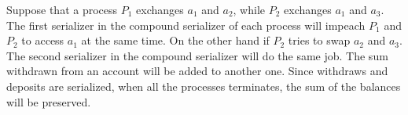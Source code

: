 \documentclass[a4paper,12pt]{article}
\begin{document}
Suppose that a process $P_1$ exchanges $a_1$ and $a_2$, while $P_2$
exchanges $a_1$ and $a_3$.  The first serializer in the compound
serializer of each process will impeach $P_1$ and $P_2$ to access
$a_1$ at the same time.  On the other hand if $P_2$ tries to swap
$a_2$ and $a_3$.  The second serializer in the compound serializer
will do the same job.  The sum withdrawn from an account will be added
to another one.  Since withdraws and deposits are serialized, when all
the processes terminates, the sum of the balances will be preserved.
\end{document}
